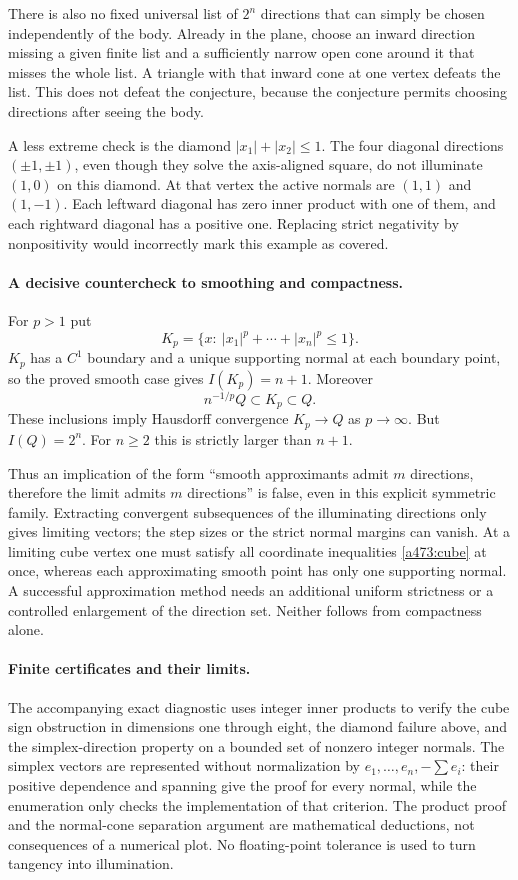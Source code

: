 \documentclass[11pt]{article}
\begin{document}
There is also no fixed universal list of $2^n$ directions that can simply be chosen independently of the body. Already in the plane, choose an inward direction missing a given finite list and a sufficiently narrow open cone around it that misses the whole list. A triangle with that inward cone at one vertex defeats the list. This does not defeat the conjecture, because the conjecture permits choosing directions after seeing the body.

A less extreme check is the diamond $|x_1|+|x_2|\leq1$. The four diagonal directions $(\pm1,\pm1)$, even though they solve the axis-aligned square, do not illuminate $(1,0)$ on this diamond. At that vertex the active normals are $(1,1)$ and $(1,-1)$. Each leftward diagonal has zero inner product with one of them, and each rightward diagonal has a positive one. Replacing strict negativity by nonpositivity would incorrectly mark this example as covered.

\paragraph{A decisive countercheck to smoothing and compactness.}
For $p>1$ put
\[
                 K_p=\{x:\ |x_1|^p+\cdots+|x_n|^p\leq1\}.
\]
$K_p$ has a $C^1$ boundary and a unique supporting normal at each boundary point, so the proved smooth case gives $I(K_p)=n+1$. Moreover
\[
                       n^{-1/p}Q\subset K_p\subset Q.
\]
These inclusions imply Hausdorff convergence $K_p\longrightarrow Q$ as $p\to\infty$. But $I(Q)=2^n$. For $n\geq2$ this is strictly larger than $n+1$.

Thus an implication of the form ``smooth approximants admit $m$ directions, therefore the limit admits $m$ directions'' is false, even in this explicit symmetric family. Extracting convergent subsequences of the illuminating directions only gives limiting vectors; the step sizes or the strict normal margins can vanish. At a limiting cube vertex one must satisfy all coordinate inequalities \eqref{a473:cube} at once, whereas each approximating smooth point has only one supporting normal. A successful approximation method needs an additional uniform strictness or a controlled enlargement of the direction set. Neither follows from compactness alone.

\paragraph{Finite certificates and their limits.}
The accompanying exact diagnostic uses integer inner products to verify the cube sign obstruction in dimensions one through eight, the diamond failure above, and the simplex-direction property on a bounded set of nonzero integer normals. The simplex vectors are represented without normalization by $e_1,\ldots,e_n,-\sum e_i$: their positive dependence and spanning give the proof for every normal, while the enumeration only checks the implementation of that criterion. The product proof and the normal-cone separation argument are mathematical deductions, not consequences of a numerical plot. No floating-point tolerance is used to turn tangency into illumination.
\end{document}
